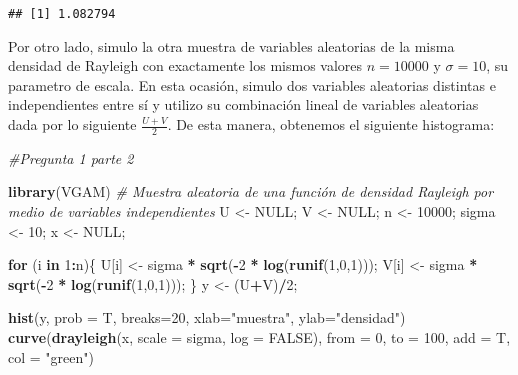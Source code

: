 \documentclass[
]{article}
\newenvironment{Shaded}{\begin{snugshade}}{\end{snugshade}}
\newcommand{\CommentTok}[1]{\textcolor[rgb]{0.56,0.35,0.01}{\textit{#1}}}
\newcommand{\ControlFlowTok}[1]{\textcolor[rgb]{0.13,0.29,0.53}{\textbf{#1}}}
\newcommand{\DataTypeTok}[1]{\textcolor[rgb]{0.13,0.29,0.53}{#1}}
\newcommand{\DecValTok}[1]{\textcolor[rgb]{0.00,0.00,0.81}{#1}}
\newcommand{\KeywordTok}[1]{\textcolor[rgb]{0.13,0.29,0.53}{\textbf{#1}}}
\newcommand{\NormalTok}[1]{#1}
\newcommand{\OperatorTok}[1]{\textcolor[rgb]{0.81,0.36,0.00}{\textbf{#1}}}
\newcommand{\OtherTok}[1]{\textcolor[rgb]{0.56,0.35,0.01}{#1}}
\newcommand{\StringTok}[1]{\textcolor[rgb]{0.31,0.60,0.02}{#1}}
\begin{document}
\begin{verbatim}
## [1] 1.082794
\end{verbatim}

Por otro lado, simulo la otra muestra de variables aleatorias de la
misma densidad de Rayleigh con exactamente los mismos valores
\(n=10000\) y \(\sigma =10\), su parametro de escala. En esta ocasión,
simulo dos variables aleatorias distintas e independientes entre sí y
utilizo su combinación lineal de variables aleatorias dada por lo
siguiente \(\frac{U+V}{2}\). De esta manera, obtenemos el siguiente
histograma:

\begin{Shaded}
\begin{Highlighting}[]
\CommentTok{#Pregunta 1 parte 2}

\KeywordTok{library}\NormalTok{(VGAM)}
\CommentTok{# Muestra aleatoria de una función de densidad Rayleigh por medio de variables independientes}
\NormalTok{U <-}\StringTok{ }\OtherTok{NULL}\NormalTok{; V <-}\StringTok{ }\OtherTok{NULL}\NormalTok{; n <-}\StringTok{ }\DecValTok{10000}\NormalTok{; sigma <-}\StringTok{ }\DecValTok{10}\NormalTok{; x <-}\StringTok{ }\OtherTok{NULL}\NormalTok{;}


\ControlFlowTok{for}\NormalTok{ (i }\ControlFlowTok{in} \DecValTok{1}\OperatorTok{:}\NormalTok{n)\{}
\NormalTok{  U[i] <-}\StringTok{ }\NormalTok{sigma }\OperatorTok{*}\StringTok{ }\KeywordTok{sqrt}\NormalTok{(}\OperatorTok{-}\DecValTok{2} \OperatorTok{*}\StringTok{ }\KeywordTok{log}\NormalTok{(}\KeywordTok{runif}\NormalTok{(}\DecValTok{1}\NormalTok{,}\DecValTok{0}\NormalTok{,}\DecValTok{1}\NormalTok{)));}
\NormalTok{  V[i] <-}\StringTok{ }\NormalTok{sigma }\OperatorTok{*}\StringTok{ }\KeywordTok{sqrt}\NormalTok{(}\OperatorTok{-}\DecValTok{2} \OperatorTok{*}\StringTok{ }\KeywordTok{log}\NormalTok{(}\KeywordTok{runif}\NormalTok{(}\DecValTok{1}\NormalTok{,}\DecValTok{0}\NormalTok{,}\DecValTok{1}\NormalTok{)));}
\NormalTok{\}}
\NormalTok{y <-}\StringTok{ }\NormalTok{(U}\OperatorTok{+}\NormalTok{V)}\OperatorTok{/}\DecValTok{2}\NormalTok{;}

\KeywordTok{hist}\NormalTok{(y, }\DataTypeTok{prob =}\NormalTok{ T, }\DataTypeTok{breaks=}\DecValTok{20}\NormalTok{, }\DataTypeTok{xlab=}\StringTok{"muestra"}\NormalTok{, }\DataTypeTok{ylab=}\StringTok{"densidad"}\NormalTok{)}
\KeywordTok{curve}\NormalTok{(}\KeywordTok{drayleigh}\NormalTok{(x, }\DataTypeTok{scale =}\NormalTok{ sigma, }\DataTypeTok{log =} \OtherTok{FALSE}\NormalTok{), }\DataTypeTok{from =} \DecValTok{0}\NormalTok{, }\DataTypeTok{to =} \DecValTok{100}\NormalTok{, }\DataTypeTok{add =}\NormalTok{ T, }\DataTypeTok{col =} \StringTok{"green"}\NormalTok{)}
\end{Highlighting}
\end{Shaded}
\end{document}
